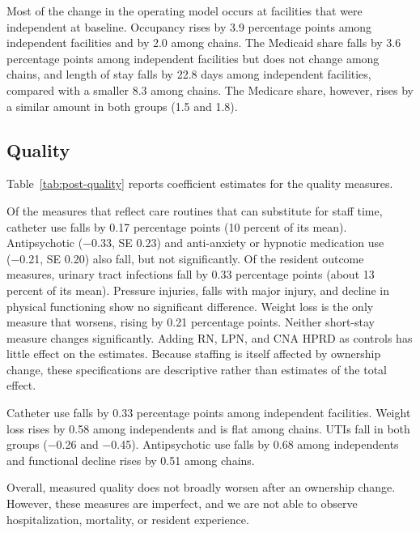 \documentclass[12pt]{article}
\begin{document}
Most of the change in the operating model occurs at facilities that were independent at baseline. Occupancy rises by 3.9 percentage points among independent facilities and by 2.0 among chains. The Medicaid share falls by 3.6 percentage points among independent facilities but does not change among chains, and length of stay falls by 22.8 days among independent facilities, compared with a smaller 8.3 among chains. The Medicare share, however, rises by a similar amount in both groups (1.5 and 1.8).


\FloatBarrier

\subsection{Quality}

Table~\ref{tab:post-quality} reports coefficient estimates for the quality measures.

Of the measures that reflect care routines that can substitute for staff time, catheter use falls by 0.17 percentage points (10 percent of its mean). Antipsychotic (−0.33, SE 0.23) and anti-anxiety or hypnotic medication use (−0.21, SE 0.20) also fall, but not significantly. Of the resident outcome measures, urinary tract infections fall by 0.33 percentage points (about 13 percent of its mean). Pressure injuries, falls with major injury, and decline in physical functioning show no significant difference. Weight loss is the only measure that worsens, rising by 0.21 percentage points. Neither short-stay measure changes significantly. Adding RN, LPN, and CNA HPRD as controls has little effect on the estimates. Because staffing is itself affected by ownership change, these specifications are descriptive rather than estimates of the total effect.

Catheter use falls by 0.33 percentage points among independent facilities. Weight loss rises by 0.58 among independents and is flat among chains. UTIs fall in both groups (−0.26 and −0.45). Antipsychotic use falls by 0.68 among independents and functional decline rises by 0.51 among chains.

Overall, measured quality does not broadly worsen after an ownership change. However, these measures are imperfect, and we are not able to observe hospitalization, mortality, or resident experience. 


\FloatBarrier
\end{document}

